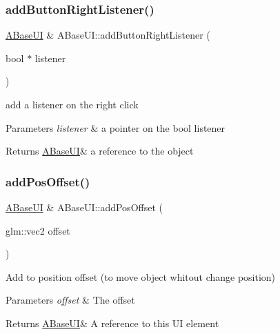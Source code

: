 \subsubsection{\texorpdfstring{add\+Button\+Right\+Listener()}{addButtonRightListener()}}
{\footnotesize\ttfamily \hyperlink{class_a_base_u_i}{A\+Base\+UI} \& A\+Base\+U\+I\+::add\+Button\+Right\+Listener (\begin{DoxyParamCaption}\item[{bool $\ast$}]{listener }\end{DoxyParamCaption})\hspace{0.3cm}{\ttfamily [virtual]}}



add a listener on the right click 


\begin{DoxyParams}{Parameters}
{\em listener} & a pointer on the bool listener \\
\hline
\end{DoxyParams}
\begin{DoxyReturn}{Returns}
\hyperlink{class_a_base_u_i}{A\+Base\+UI}\& a reference to the object 
\end{DoxyReturn}
\mbox{\label{class_a_base_u_i_abdf5aa14ea0b34192142fcbff0348fc0}} 
\subsubsection{\texorpdfstring{add\+Pos\+Offset()}{addPosOffset()}}
{\footnotesize\ttfamily \hyperlink{class_a_base_u_i}{A\+Base\+UI} \& A\+Base\+U\+I\+::add\+Pos\+Offset (\begin{DoxyParamCaption}\item[{glm\+::vec2}]{offset }\end{DoxyParamCaption})\hspace{0.3cm}{\ttfamily [virtual]}}



Add to position offset (to move object whitout change position) 


\begin{DoxyParams}{Parameters}
{\em offset} & The offset \\
\hline
\end{DoxyParams}
\begin{DoxyReturn}{Returns}
\hyperlink{class_a_base_u_i}{A\+Base\+UI}\& A reference to this UI element 
\end{DoxyReturn}
\mbox{\label{class_a_base_u_i_a88045d863a2736eac2200918b0268187}} 
